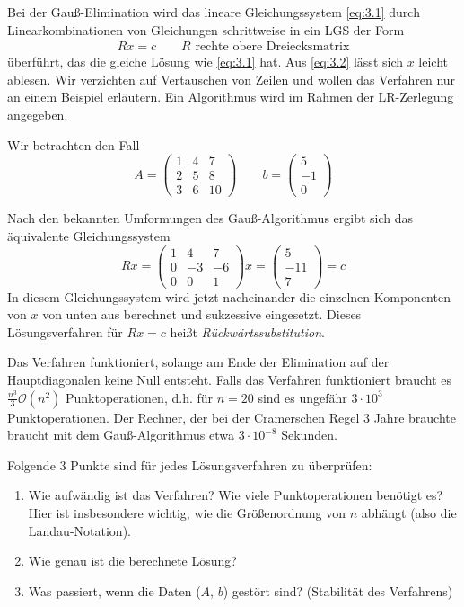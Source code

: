 \documentclass{mycourse}
\begin{document}
\begin{ex}
\label{ex:3.2}
Bei der Gauß-Elimination wird das lineare Gleichungssystem \eqref{eq:3.1} durch Linearkombinationen von Gleichungen schrittweise in ein LGS der Form
\begin{align}
\label{eq:3.2}
Rx=c \qquad R\text{ rechte obere Dreiecksmatrix}
\end{align}
überführt, das die gleiche Lösung wie \eqref{eq:3.1} hat.
Aus \eqref{eq:3.2} lässt sich $x$ leicht ablesen.
Wir verzichten auf Vertauschen von Zeilen und wollen das Verfahren nur an einem Beispiel erläutern.
Ein Algorithmus wird im Rahmen der LR-Zerlegung angegeben.

Wir betrachten den Fall
\[
A=\begin{pmatrix}1&4&7\\ 2&5&8\\ 3&6&10\end{pmatrix} \qquad b=\begin{pmatrix} 5\\-1\\ 0\end{pmatrix}
\]

Nach den bekannten Umformungen des Gauß-Algorithmus ergibt sich das äquivalente Gleichungssystem
\[
Rx= \begin{pmatrix} 1&4&7\\0&-3&-6\\ 0&0&1\end{pmatrix}
x= \begin{pmatrix} 5\\-11\\7\end{pmatrix} = c
\]
In diesem Gleichungssystem wird jetzt nacheinander die einzelnen Komponenten von $x$ von unten aus berechnet und sukzessive eingesetzt.
Dieses Lösungsverfahren für $Rx=c$ heißt \emph{Rückwärtssubstitution}.

Das Verfahren funktioniert, solange am Ende der Elimination auf der Hauptdiagonalen keine Null entsteht.
Falls das Verfahren funktioniert braucht es $\frac{n^3}3\mathcal O(n^2)$ Punktoperationen, d.h. für $n=20$ sind es ungefähr
$3\cdot 10^3$ Punktoperationen. Der Rechner, der bei der Cramerschen Regel 3 Jahre brauchte braucht mit dem Gauß-Algorithmus etwa $3\cdot 10^{-8}$ Sekunden.

Folgende 3 Punkte sind für jedes Lösungsverfahren zu überprüfen:
\begin{enumerate}
\item Wie aufwändig ist das Verfahren?
Wie viele Punktoperationen benötigt es?
Hier ist insbesondere wichtig, wie die Größenordnung von $n$ abhängt (also die Landau-Notation).
\item Wie genau ist die berechnete Lösung?
\item Was passiert, wenn die Daten ($A$, $b$) gestört sind? (Stabilität des Verfahrens)
\end{enumerate}
\end{ex}
\end{document}

